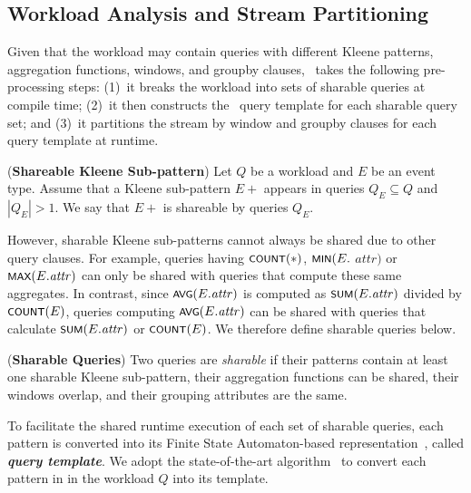 \subsection{Workload Analysis and Stream Partitioning}
\label{sec:tempalte}

Given that the workload may contain queries with different Kleene patterns, aggregation functions, windows, and groupby clauses, \app\ takes the following pre-processing steps:
(1)~it breaks the workload  into  sets of sharable queries at compile time;
(2)~it then constructs the \app\ query template for each sharable query set; and
(3)~it partitions the stream by window and groupby clauses for each query template at runtime. 

\begin{definition}(\textbf{Shareable Kleene Sub-pattern})
%
Let $Q$ be a workload and $E$ be an event type. 
Assume that a Kleene sub-pattern $E+$ appears in queries $Q_E \subseteq Q$ and $|Q_E| > 1$. 
We say that $E+$ is shareable by queries $Q_E$.
%
\label{def:shareable-sub-pattern}
\end{definition}

However, sharable Kleene sub-patterns cannot always be shared due to other query clauses. For example, queries having $\textsf{\footnotesize COUNT}(*)$, $\textsf{\footnotesize MIN}(E.$ $\mathit{attr})$ or $\textsf{\footnotesize MAX}(E.\mathit{attr})$ can only be shared with queries that compute these same aggregates. 
In contrast,   
since $\textsf{\footnotesize AVG}(E.\mathit{attr})$ is computed as $\textsf{\footnotesize SUM}(E.\mathit{attr})$ divided by $\textsf{\footnotesize COUNT}(E)$, queries computing $\textsf{\footnotesize AVG}(E.\mathit{attr})$ can be shared with queries that calculate $\textsf{\footnotesize SUM}(E.\mathit{attr})$ or $\textsf{\footnotesize COUNT}(E)$.
We therefore define sharable queries below.

\begin{definition}(\textbf{Sharable Queries})
%
Two queries are \textit{sharable} if their patterns contain at least one sharable Kleene sub-pattern, their aggregation functions can be shared, their windows overlap, and their grouping attributes are the same.
%
\label{def:sharable_queries}
\end{definition}

To facilitate the shared runtime execution of each set of sharable queries, each pattern is converted into its Finite State Automaton-based representation~\cite{ADGI08, DGPRSW07, WDR06, ZDI14}, called \textbf{\textit{query template}}.
We adopt the state-of-the-art algorithm~\cite{PLRM18} to convert each pattern in in the workload $Q$ into its template.

